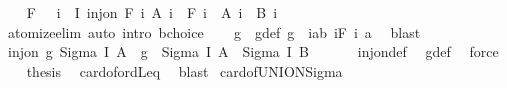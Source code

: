 \begin{isabellebody}
\ \ \isamarkupfalse%
\ F\ \ {}{\isacharcolon}{\kern0pt}\ {\isachardoublequoteopen}{\isasymforall}i\ {\isasymin}\ I{\isachardot}{\kern0pt}\ inj{\isacharunderscore}{\kern0pt}on\ {\isacharparenleft}{\kern0pt}F\ i{\isacharparenright}{\kern0pt}\ {\isacharparenleft}{\kern0pt}A\ i{\isacharparenright}{\kern0pt}\ {\isasymand}\ {\isacharparenleft}{\kern0pt}F\ i{\isacharparenright}{\kern0pt}\ {\isacharbackquote}{\kern0pt}\ {\isacharparenleft}{\kern0pt}A\ i{\isacharparenright}{\kern0pt}\ {\isasymle}\ B\ i{\isachardoublequoteclose}\isanewline
\ \ \ \ \isamarkupfalse%
\ atomize{\isacharunderscore}{\kern0pt}elim\ {\isacharparenleft}{\kern0pt}auto\ intro{\isacharcolon}{\kern0pt}\ bchoice{\isacharparenright}{\kern0pt}\isanewline
\ \ \isamarkupfalse%
\ g\ \ g{\isacharunderscore}{\kern0pt}def{\isacharcolon}{\kern0pt}\ {\isachardoublequoteopen}g\ {\isacharequal}{\kern0pt}\ {\isacharparenleft}{\kern0pt}{\isasymlambda}{\isacharparenleft}{\kern0pt}i{\isacharcomma}{\kern0pt}a{\isacharcolon}{\kern0pt}{\isacharcolon}{\kern0pt}{\isacharprime}{\kern0pt}b{\isacharparenright}{\kern0pt}{\isachardot}{\kern0pt}\ {\isacharparenleft}{\kern0pt}i{\isacharcomma}{\kern0pt}F\ i\ a{\isacharparenright}{\kern0pt}{\isacharparenright}{\kern0pt}{\isachardoublequoteclose}\ \isamarkupfalse%
\ blast\isanewline
\ \ \isamarkupfalse%
\ {\isachardoublequoteopen}inj{\isacharunderscore}{\kern0pt}on\ g\ {\isacharparenleft}{\kern0pt}Sigma\ I\ A{\isacharparenright}{\kern0pt}\ {\isasymand}\ g\ {\isacharbackquote}{\kern0pt}\ {\isacharparenleft}{\kern0pt}Sigma\ I\ A{\isacharparenright}{\kern0pt}\ {\isasymle}\ {\isacharparenleft}{\kern0pt}Sigma\ I\ B{\isacharparenright}{\kern0pt}{\isachardoublequoteclose}\isanewline
\ \ \isamarkupfalse%
\ {}\ \isamarkupfalse%
\ inj{\isacharunderscore}{\kern0pt}on{\isacharunderscore}{\kern0pt}def\ \isamarkupfalse%
\ g{\isacharunderscore}{\kern0pt}def\ \isamarkupfalse%
\ force\isanewline
\ \ \isamarkupfalse%
\ {\isacharquery}{\kern0pt}thesis\ \isamarkupfalse%
\ card{\isacharunderscore}{\kern0pt}of{\isacharunderscore}{\kern0pt}ordLeq\ \isamarkupfalse%
\ blast\isanewline
{}\isamarkupfalse%
%
\endisatagproof
{\isafoldproof}%
%
\isadelimproof
\isanewline
%
\endisadelimproof
\isanewline
{}\isamarkupfalse%
\ card{\isacharunderscore}{\kern0pt}of{\isacharunderscore}{\kern0pt}UNION{\isacharunderscore}{\kern0pt}Sigma{\isacharcolon}{\kern0pt}\isanewline

\end{isabellebody}
